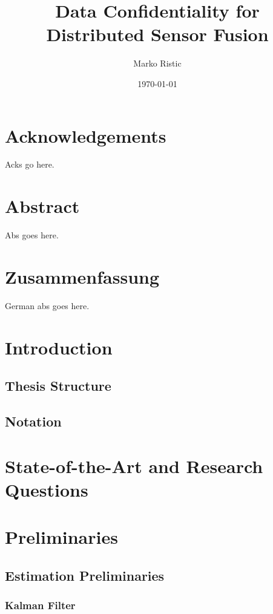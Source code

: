 \documentclass[oneside]{scrbook}
\title{Data Confidentiality for Distributed Sensor Fusion}
\author{Marko Ristic}
\date{\today}
\begin{document}
\maketitle

\frontmatter
\tableofcontents
\listoffigures
\listoftables

\chapter{Acknowledgements}

Acks go here.

\chapter{Abstract}

Abs goes here.

\chapter{Zusammenfassung}

German abs goes here.

\mainmatter

\chapter{Introduction}
\section{Thesis Structure}
\section{Notation}

\chapter{State-of-the-Art and Research Questions}

\chapter{Preliminaries}
\section{Estimation Preliminaries}
\subsection{Kalman Filter}
\end{document}
